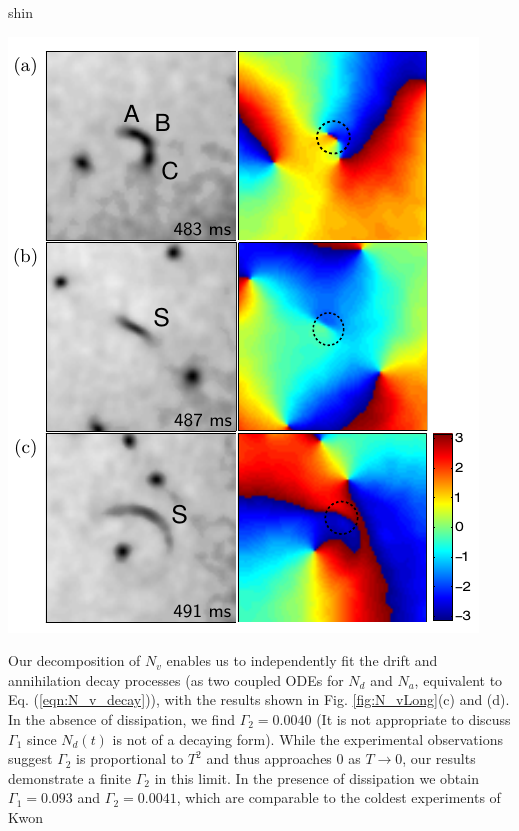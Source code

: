 \begin{chapter}{\label{cha:shin}shin}
\noindent\begin{minipage}{1\textwidth}
\begin{minipage}{0.45\textwidth}
\centering
\includegraphics[width=0.9\linewidth]{shin/fig5}
\end{minipage} \hfill
\begin{minipage}{0.5\textwidth}
Our decomposition of $N_v$ enables us to independently fit the drift and annihilation decay processes (as two coupled ODEs for $N_d$ and $N_a$, equivalent to Eq. (\ref{eqn:N_v_decay})), with the results shown in Fig. \ref{fig:N_vLong}(c) and (d).  In the absence of dissipation, we find $\Gamma_{2} = 0.0040$ (It is not appropriate to discuss $\Gamma_1$ since $N_d(t)$ is not of a decaying form). While the experimental observations \cite{kwon_moon_14} suggest $\Gamma_2$ is proportional to $T^2$ and thus approaches 0 as $T\rightarrow0$, our results demonstrate a finite $\Gamma_2$ in this limit.  In the presence of dissipation we obtain $\Gamma_{1} = 0.093$ and $\Gamma_{2} = 0.0041$, which are comparable to the coldest experiments of Kwon \etal
\end{minipage}
\end{minipage}



\end{chapter}
